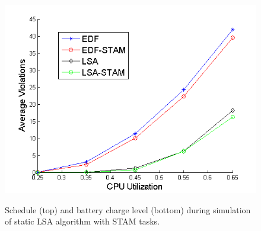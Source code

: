 \begin{figure}[tb]
\begin{center}
\includegraphics[scale=0.57]{violations_vs_cpuutil.png}
\label{fig:violations_vs_cpuutil}
\caption{Schedule (top) and battery charge level (bottom) during simulation of static LSA algorithm with STAM tasks.}
\end{center}
\end{figure}



































